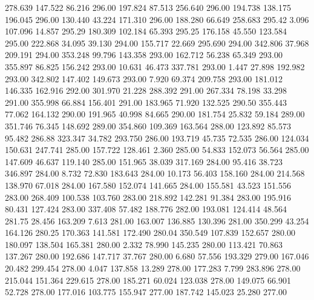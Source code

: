  278.639  147.522   86.216       296.00
 197.824   87.513  256.640       296.00
 194.738  138.175  196.045       296.00
 130.440   43.224  171.310       296.00
 188.280   66.649  258.683       295.42
   3.096  107.096   14.857       295.29
 180.309  102.184   65.393       295.25
 176.158   45.550  123.584       295.00
 222.868   34.095   39.130       294.00
 155.717   22.669  295.690       294.00
 342.806   37.968  209.191       294.00
 353.248   99.796  143.358       293.00
 162.712   56.238   65.349       293.00
 355.897   86.825  156.242       293.00
  10.631   46.473  337.781       293.00
   1.447   27.898  192.982       293.00
 342.802  147.402  149.673       293.00
   7.920   69.374  209.758       293.00
 181.012  146.335  162.916       292.00
 301.970   21.228  288.392       291.00
 267.334   78.198   33.298       291.00
 355.998   66.884  156.401       291.00
 183.965   71.920  132.525       290.50
 355.443   77.062  164.132       290.00
 191.965   40.998   84.665       290.00
 181.754   25.832   59.184       289.00
 351.746   76.345  148.692       289.00
 354.860  109.369  163.564       288.00
 123.892   85.573   95.482       286.88
 323.347   34.782  293.750       286.00
 193.719   45.735   72.535       286.00
 124.034  150.631  247.741       285.00
 157.722  128.461    2.360       285.00
  54.833  152.073   56.564       285.00
 147.609   46.637  119.140       285.00
 151.965   38.039  317.169       284.00
  95.416   38.723  346.897       284.00
   8.732   72.830  183.643       284.00
  10.173   56.403  158.160       284.00
 214.568  138.970   67.018       284.00
 167.580  152.074  141.665       284.00
 155.581   43.523  151.556       283.00
 268.409  100.538  103.760       283.00
 218.892  142.281   91.384       283.00
 195.916   80.431  127.424       283.00
 337.408   57.482  188.776       282.00
 193.081  124.414   48.564       281.75
  28.456  163.209    7.613       281.00
 163.007  136.885  130.396       281.00
 350.299   43.254  164.126       280.25
 170.363  141.581  172.490       280.04
 350.549  107.839  152.657       280.00
 180.097  138.504  165.381       280.00
   2.332   78.990  145.235       280.00
 113.421   70.863  137.267       280.00
 192.686  147.717   37.767       280.00
   6.680   57.556  193.329       279.00
 167.046   20.482  299.454       278.00
   4.047  137.858   13.289       278.00
 177.283    7.799  283.896       278.00
 215.044  151.364  229.615       278.00
 185.271   60.024  123.038       278.00
 149.075   66.901   52.728       278.00
 177.016  103.775  155.947       277.00
 187.742  145.023   25.280       277.00
